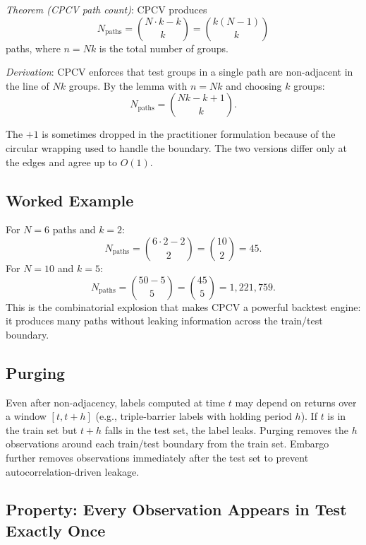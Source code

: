 \emph{Theorem (CPCV path count)}: CPCV produces
\[
\boxed{\; N_{\text{paths}} = \binom{N \cdot k - k}{k} = \binom{k (N - 1)}{k} \;}
\]
paths, where $n = N k$ is the total number of groups.

\emph{Derivation}: CPCV enforces that test groups in a single path
are non-adjacent in the line of $N k$ groups. By the lemma with $n =
Nk$ and choosing $k$ groups:
\[
N_{\text{paths}} = \binom{Nk - k + 1}{k}.
\]

The $+1$ is sometimes dropped in the practitioner formulation because
of the circular wrapping used to handle the boundary. The two
versions differ only at the edges and agree up to $O(1)$.

\subsection{Worked Example}

For $N = 6$ paths and $k = 2$:
\[
N_{\text{paths}} = \binom{6 \cdot 2 - 2}{2} = \binom{10}{2} = 45.
\]
For $N = 10$ and $k = 5$:
\[
N_{\text{paths}} = \binom{50 - 5}{5} = \binom{45}{5} = 1{,}221{,}759.
\]
This is the combinatorial explosion that makes CPCV a powerful
backtest engine: it produces many paths without leaking information
across the train/test boundary.

\subsection{Purging}


Even after non-adjacency, labels computed at time $t$ may depend on
returns over a window $[t, t+h]$ (e.g., triple-barrier labels with
holding period $h$). If $t$ is in the train set but $t + h$ falls in
the test set, the label leaks. Purging removes the $h$ observations
around each train/test boundary from the train set. Embargo further
removes observations immediately after the test set to prevent
autocorrelation-driven leakage.

\subsection{Property: Every Observation Appears in Test Exactly Once}

